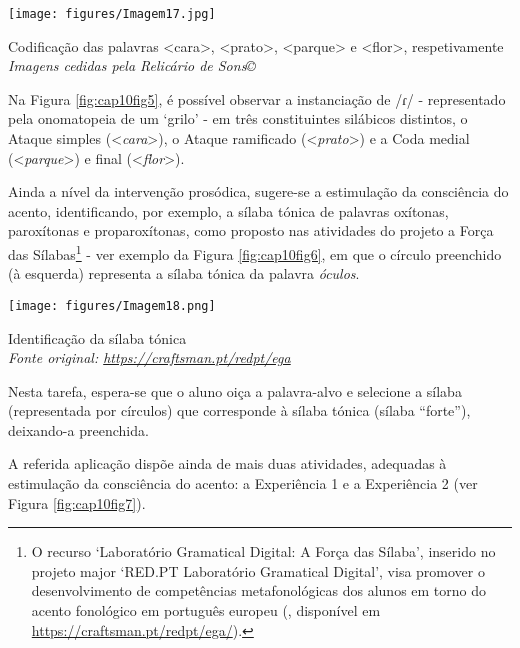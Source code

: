 \documentclass[output=paper,colorlinks,citecolor=brown,booklanguage=portuguese]{langscibook}
\begin{document}
\begin{Figura}
    \centering
    \texttt{[image: figures/Imagem17.jpg]}



    \caption{{Codificação das palavras <cara>, <prato>, <parque> e <flor>, respetivamente}\\
    \emph{\small{Imagens cedidas pela Relicário de Sons©}}}
    \label{fig:cap10fig5}
\end{Figura}


Na Figura \ref{fig:cap10fig5}, é possível observar a instanciação de /ɾ/ - representado pela onomatopeia de um ‘grilo’ - em três constituintes silábicos distintos, o Ataque simples (<\emph{cara}>), o Ataque ramificado (<\emph{prato}>) e a Coda medial (<\emph{parque}>) e final (<\emph{flor}>).

Ainda a nível da intervenção prosódica, sugere-se a estimulação da consciência do acento, identificando, por exemplo, a sílaba tónica de palavras oxítonas, paroxítonas e proparoxítonas, como proposto nas atividades do projeto a Força das Sílabas\footnote{O recurso ‘Laboratório Gramatical Digital: A Força das Sílaba’, inserido no projeto major ‘RED.PT Laboratório Gramatical Digital’, visa promover o desenvolvimento de competências metafonológicas dos alunos em torno do acento fonológico em português europeu (\citealp{Cardoso2020}, disponível em \url{https://craftsman.pt/redpt/ega/}).} - ver exemplo da Figura \ref{fig:cap10fig6}, em que o círculo preenchido (à esquerda) representa a sílaba tónica da palavra \emph{óculos}.



\begin{Figura}
    \centering
    \texttt{[image: figures/Imagem18.png]}



    \caption{{ Identificação da sílaba tónica}\\ \emph{\small{Fonte original: \url{https://craftsman.pt/redpt/ega}}}}
    \label{fig:cap10fig6}
\end{Figura}


Nesta tarefa, espera-se que o aluno oiça a palavra-alvo e selecione a sílaba (representada por círculos) que corresponde à sílaba tónica (sílaba “forte”), deixan\-do-a preenchida. 

A referida aplicação dispõe ainda de mais duas atividades, adequadas à estimulação da consciência do acento: a Experiência 1 e a Experiência 2 (ver Figura \ref{fig:cap10fig7}).
\end{document}

